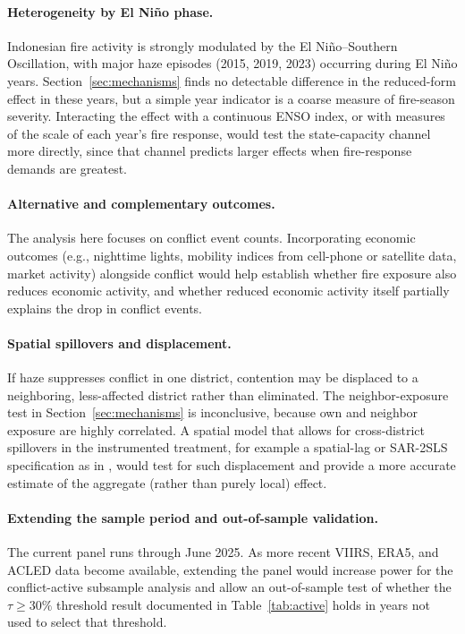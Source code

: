 \documentclass[12pt]{article}
\begin{document}
\paragraph{Heterogeneity by El Ni\~{n}o phase.} Indonesian fire activity is strongly modulated by the El Ni\~{n}o--Southern Oscillation, with major haze episodes (2015, 2019, 2023) occurring during El Ni\~{n}o years. Section~\ref{sec:mechanisms} finds no detectable difference in the reduced-form effect in these years, but a simple year indicator is a coarse measure of fire-season severity. Interacting the effect with a continuous ENSO index, or with measures of the scale of each year's fire response, would test the state-capacity channel more directly, since that channel predicts larger effects when fire-response demands are greatest.

\paragraph{Alternative and complementary outcomes.} The analysis here focuses on conflict event counts. Incorporating economic outcomes (e.g., nighttime lights, mobility indices from cell-phone or satellite data, market activity) alongside conflict would help establish whether fire exposure also reduces economic activity, and whether reduced economic activity itself partially explains the drop in conflict events.

\paragraph{Spatial spillovers and displacement.} If haze suppresses conflict in one district, contention may be displaced to a neighboring, less-affected district rather than eliminated. The neighbor-exposure test in Section~\ref{sec:mechanisms} is inconclusive, because own and neighbor exposure are highly correlated. A spatial model that allows for cross-district spillovers in the instrumented treatment, for example a spatial-lag or SAR-2SLS specification as in \citet{lu2023fish}, would test for such displacement and provide a more accurate estimate of the aggregate (rather than purely local) effect.

\paragraph{Extending the sample period and out-of-sample validation.} The current panel runs through June 2025. As more recent VIIRS, ERA5, and ACLED data become available, extending the panel would increase power for the conflict-active subsample analysis and allow an out-of-sample test of whether the $\tau \geq 30\%$ threshold result documented in Table~\ref{tab:active} holds in years not used to select that threshold.
\end{document}
